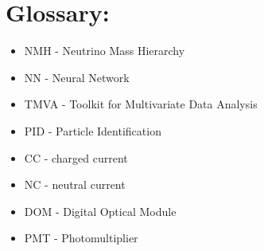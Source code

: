 \chapter*{Glossary:}

{\Large
\begin{itemize}
\item NMH - Neutrino Mass Hierarchy
\item NN - Neural Network
\item TMVA - Toolkit for Multivariate Data Analysis
\item PID - Particle Identification
\item CC - charged current 
\item NC - neutral current
\item DOM - Digital Optical Module
\item PMT - Photomultiplier
\end{itemize}
}